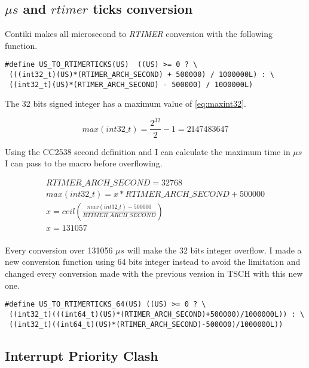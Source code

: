 \subsection{$\mu s$ and $rtimer$ ticks conversion}

Contiki makes all microsecond to \emph{RTIMER} conversion with the following
function.

\begin{lstlisting}
#define US_TO_RTIMERTICKS(US)  ((US) >= 0 ? \
 (((int32_t)(US)*(RTIMER_ARCH_SECOND) + 500000) / 1000000L) : \
 ((int32_t)(US)*(RTIMER_ARCH_SECOND) - 500000) / 1000000L)
\end{lstlisting}

The 32 bits signed integer has a maximum value of \ref{eq:maxint32}.

\begin{equation}
  \label{eq:maxint32}
  max(int32\_t) = \frac{2^{32}}{2} - 1 = 2147483647
\end{equation}

Using the CC2538 second definition and I can calculate the maximum time in $\mu s$
I can pass to the macro before overflowing.

\begin{equation}
  \label{eq:maxus}
  \begin{multlined}
  RTIMER\_ARCH\_SECOND = 32768 \\
  max(int32\_t) = x * RTIMER\_ARCH\_SECOND + 500000 \\
  x = ceil(\frac{max(int32\_t) - 500000}{RTIMER\_ARCH\_SECOND}) \\
  x = 131057 \\
  \end{multlined}
\end{equation}

Every conversion over 131056 $\mu s$ will make the 32 bits integer overflow.
I made a new conversion function using 64 bits integer instead to avoid the
limitation and changed every conversion made with the previous version in TSCH
with this new one.

\begin{lstlisting}
#define US_TO_RTIMERTICKS_64(US) ((US) >= 0 ? \
 ((int32_t)(((int64_t)(US)*(RTIMER_ARCH_SECOND)+500000)/1000000L)) : \
 ((int32_t)((int64_t)(US)*(RTIMER_ARCH_SECOND)-500000)/1000000L))
\end{lstlisting}

\subsection{Interrupt Priority Clash}

